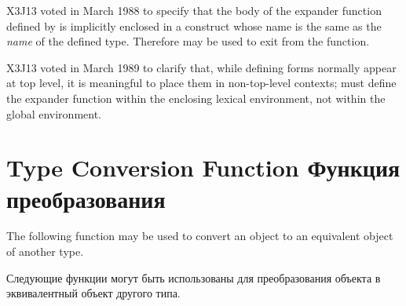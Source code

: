 \begin{defmac}
\begin{newer}
X3J13 voted in March 1988 
to specify that the body of the expander function defined
by  is implicitly enclosed in a  construct
whose name is the same as the \emph{name} of the defined type.
Therefore  may be used to exit from the function.
\end{newer}

\begin{newer}
X3J13 voted in March 1989 
to clarify that, while defining forms normally appear at top level,
it is meaningful to place them in non-top-level contexts;
 must define the expander function
within the enclosing lexical environment, not within the global
environment.
\end{newer}

\end{defmac}

\section{Type Conversion Function Функция преобразования}

The following function may be used to convert an object to an
equivalent object of another type.

Следующие функции могут быть использованы для преобразования объекта в
эквивалентный объект другого типа.

